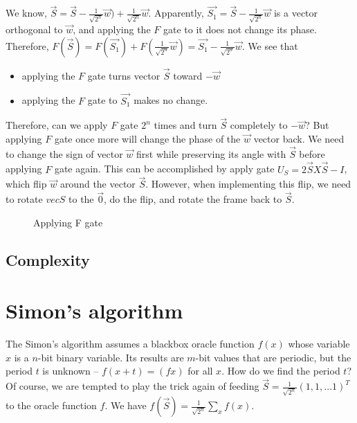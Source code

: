 \documentclass{ctexbook}
\begin{document}
We know, $\vec{S} = \vec{S} - \frac 1 {\sqrt{2^n}} \vec{w}) + \frac 1  {\sqrt{2^n}} \vec{w}$. Apparently, $\vec{S_1}  = \vec{S} - \frac 1 {\sqrt{2^n}} \vec{w}$ is a vector orthogonal to $\vec{w}$, and applying the $F$ gate to it does not change its phase. Therefore, $F(\vec{S}) = F(\vec{S_1}) + F(\frac 1  {\sqrt{2^n}} \vec{w})  = \vec{S_1} - \frac 1 {\sqrt{2^n}} \vec{w}$. We see that 
\begin{itemize}
    \item applying the $F$ gate turns vector $\vec{S}$ toward $-\vec{w}$
    \item applying the $F$ gate to $\vec{S_1}$ makes no change.
\end{itemize}
Therefore, can we apply $F$ gate $2^n$ times and turn $\vec{S}$ completely to $-\vec{w}$? But applying $F$ gate once more will change the phase of the $\vec{w}$ vector back. We need to change the sign of vector $\vec{w}$ first while preserving its angle with $\vec{S}$ before applying $F$ gate again. This can be accomplished by apply gate $U_S = 2 \vec{S}X\vec{S} -I$, which flip $\vec{w}$ around the vector $\vec{S}$. However, when implementing this flip, we need to rotate $vec{S}$ to the $\vec{0}$, do the flip, and rotate the frame back to $\vec{S}$.

\begin{figure}[h]\label{Grover}

\caption{Applying F gate}
\end{figure}

\subsection{Complexity}

\section{Simon's algorithm}
The Simon's algorithm assumes a blackbox oracle function $f(x)$ whose variable $x$ is a $n$-bit binary variable. Its results are $m$-bit values that are periodic, but the period $t$ is unknown -- $f(x+t)=(fx)$ for all $x$. How do we find the period $t$? Of course, we are tempted to play the trick again of feeding $\vec{S} = \frac 1 {\sqrt{2^n}} (1, 1, ...1)^T$ to the oracle function $f$. We have
$f(\vec{S}) = \frac 1  {\sqrt{2^n}} \sum_x f(x)$.
\end{document}
